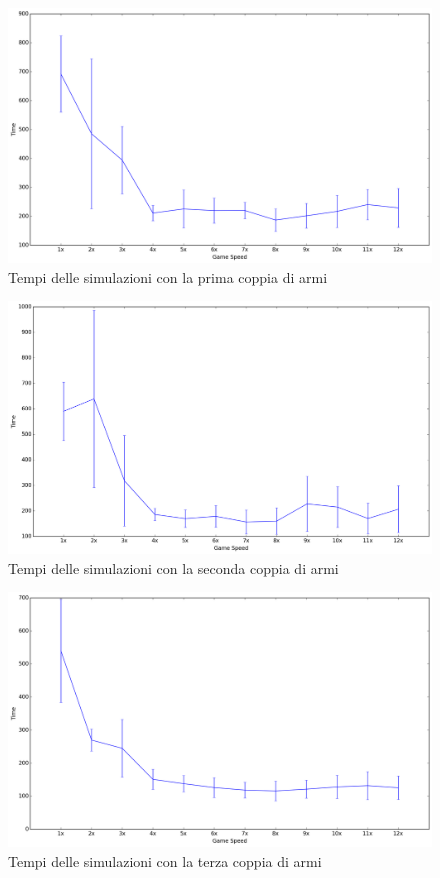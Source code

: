 \documentclass[12pt, italian]{toptesi}
\begin{document}
\begin{figure}[htp]
\centering
\includegraphics[width=1.0\textwidth]{time_speed_1}
\caption{Tempi delle simulazioni con la prima coppia di armi}
\label{fig:time_speed_1}
\end{figure}

\begin{figure}[htp]
\centering
\includegraphics[width=1.0\textwidth]{time_speed_2}
\caption{Tempi delle simulazioni con la seconda coppia di armi}
\label{fig:time_speed_2}
\end{figure}

\begin{figure}[htp]
\centering
\includegraphics[width=1.0\textwidth]{time_speed_3}
\caption{Tempi delle simulazioni con la terza coppia di armi}
\label{fig:time_speed_3}
\end{figure}
\end{document}
